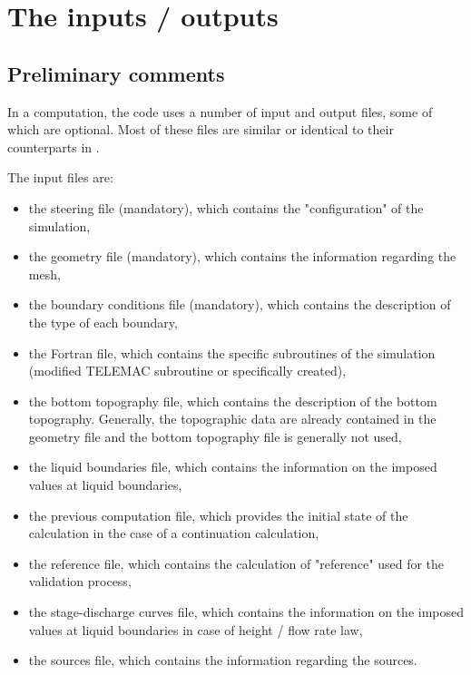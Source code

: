 \chapter{The inputs / outputs}

\section{Preliminary comments}

In a computation, the  code uses a number of input and output files,
some of which are optional. Most of these files are similar or identical to
their counterparts in .

The input files are:

\begin{itemize}
\item the steering file (mandatory), which contains the "configuration" of the
simulation,

\item the geometry file (mandatory), which contains the information regarding
the mesh,

\item the boundary conditions file (mandatory), which contains the description
of the type of each boundary,

\item the Fortran file, which contains the specific subroutines of the
simulation (modified TELEMAC subroutine or specifically created),

\item the bottom topography file, which contains the description of the bottom
topography. Generally, the topographic data are already contained in the
geometry file and the bottom topography file is generally not used,

\item the liquid boundaries file, which contains the information on the
imposed values at liquid boundaries,

\item the previous computation file, which provides the initial state of the
calculation in the case of a continuation calculation,

\item the reference file, which contains the calculation of "reference" used
for the validation process,

\item the stage-discharge curves file, which contains the information on the
imposed values at liquid boundaries in case of height / flow rate law,

\item the sources file, which contains the information regarding the sources.
\end{itemize}

